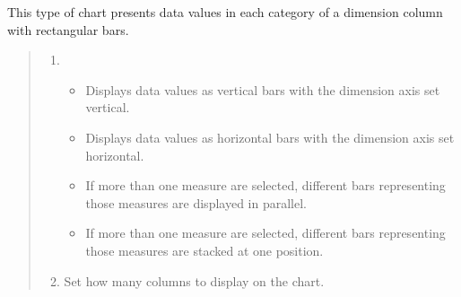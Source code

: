 \documentclass[letterpaper,10pt,english]{sphinxmanual}
\begin{document}

This type of chart presents data values in each category of a dimension column with rectangular bars.
\begin{quote}

\begin{figure}[H]
\centering

\noindent{}
\end{figure}
\begin{enumerate}
\def\theenumi{\arabic{enumi}}
\def\labelenumi{\theenumi .}
\makeatletter\def\p@enumii{\p@enumi \theenumi .}\makeatother
\item {} 
\begin{itemize}
\item {} 
 Displays data values as vertical bars with the dimension axis set vertical.

\item {} 
 Displays data values as horizontal bars with the dimension axis set horizontal.

\item {} 
 If more than one measure are selected, different bars representing those measures are displayed in parallel.

\item {} 
 If more than one measure are selected, different bars representing those measures are stacked at one position.

\end{itemize}

\item {} 
 Set how many columns to display on the chart.

\end{enumerate}
\end{quote}

\end{document}

